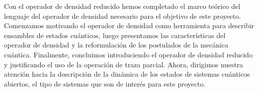 Con el operador de densidad reducido hemos completado
el marco teórico del lenguaje del operador de densidad necesario
para el objetivo de este proyecto. Comenzamos
motivando el operador de densidad como herramienta 
para describir ensambles de
estados cuánticos, luego presentamos las características
del operador de densidad y la reformulación de los postulados 
de la mecánica cuántica.
Finalmente, concluimos introduciendo el operador de densidad reducido y
justificando el uso de la operación de traza parcial. Ahora, dirigimos
nuestra atención hacia la descripción de la dinámica de los estados
de sistemas cuánticos abiertos, el tipo de sistemas que son de interés
para este proyecto.


%
